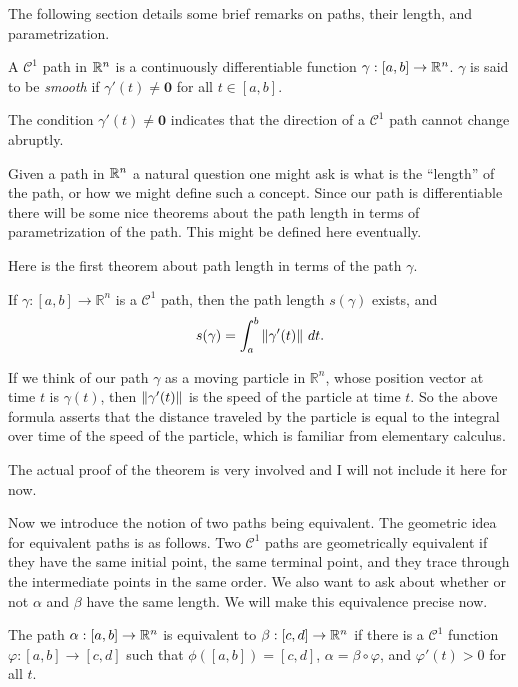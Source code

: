 The following section details some brief remarks on paths, their length, and parametrization.

\begin{definition}
A $\mathcal{C}^1$ path in $\mathbb{R}^n$ is a continuously differentiable function $\gamma: [a, b] \to \mathbb{R}^n$. $\gamma$ is said to be \textit{smooth} if $\gamma'(t) \neq \mathbf{0}$ for all $t \in [a, b]$.
\end{definition}

The condition $\gamma'(t) \neq \mathbf{0}$ indicates that the direction of a $\mathcal{C}^1$ path cannot change abruptly.

Given a path in $\mathbb{R}^n$ a natural question one might ask is what is the ``length'' of the path, or how we might define such a concept. Since our path is differentiable there will be some nice theorems about the path length in terms of parametrization of the path. This might be defined here eventually.

Here is the first theorem about path length in terms of the path $\gamma$.
\begin{theorem}
If $\gamma: [a, b] \to \mathbb{R}^n$ is a $\mathcal{C}^1$ path, then the path length $s(\gamma)$ exists, and 
\[s(\gamma) = \int_a^b\norm{\gamma'(t)}~dt.\]
\end{theorem}

If we think of our path $\gamma$ as a moving particle in $\mathbb{R}^n$, whose position vector at time $t$ is $\gamma(t)$, then $\norm{\gamma'(t)}$ is the speed of the particle at time $t$. So the above formula asserts that the distance traveled by the particle is equal to the integral over time of the speed of the particle, which is familiar from elementary calculus.

The actual proof of the theorem is very involved and I will not include it here for now.

Now we introduce the notion of two paths being equivalent. The geometric idea for equivalent paths is as follows. Two $\mathcal{C}^1$ paths are geometrically equivalent if they have the same initial point, the same terminal point, and they trace through the intermediate points in the same order. We also want to ask about whether or not $\alpha$ and $\beta$ have the same length. We will make this equivalence precise now.
\begin{definition}
The path $\alpha: [a, b] \to \mathbb{R}^n$ is equivalent to $\beta: [c, d] \to \mathbb{R}^n$ if there is a $\mathcal{C}^1$ function $\varphi: [a, b] \to [c, d]$ such that $\phi([a, b]) = [c, d]$, $\alpha = \beta \circ \varphi$, and $\varphi'(t) > 0$ for all $t$. 
\end{definition}

